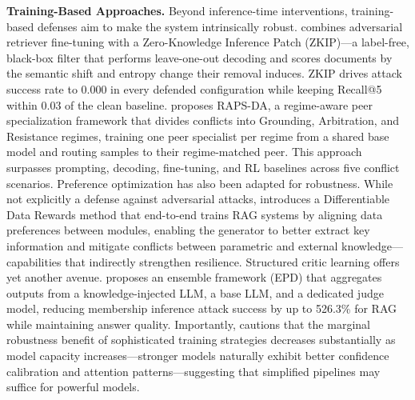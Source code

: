 \documentclass[11pt]{article}
\begin{document}
\textbf{Training-Based Approaches.} Beyond inference-time interventions, training-based defenses aim to make the system intrinsically robust. \cite{ref450} combines adversarial retriever fine-tuning with a Zero-Knowledge Inference Patch (ZKIP)---a label-free, black-box filter that performs leave-one-out decoding and scores documents by the semantic shift and entropy change their removal induces. ZKIP drives attack success rate to 0.000 in every defended configuration while keeping Recall@5 within 0.03 of the clean baseline. \cite{ref451} proposes RAPS-DA, a regime-aware peer specialization framework that divides conflicts into Grounding, Arbitration, and Resistance regimes, training one peer specialist per regime from a shared base model and routing samples to their regime-matched peer. This approach surpasses prompting, decoding, fine-tuning, and RL baselines across five conflict scenarios. Preference optimization has also been adapted for robustness. While not explicitly a defense against adversarial attacks, \cite{ref20} introduces a Differentiable Data Rewards method that end-to-end trains RAG systems by aligning data preferences between modules, enabling the generator to better extract key information and mitigate conflicts between parametric and external knowledge---capabilities that indirectly strengthen resilience. Structured critic learning offers yet another avenue. \cite{ref452} proposes an ensemble framework (EPD) that aggregates outputs from a knowledge-injected LLM, a base LLM, and a dedicated judge model, reducing membership inference attack success by up to 526.3\% for RAG while maintaining answer quality. Importantly, \cite{ref453} cautions that the marginal robustness benefit of sophisticated training strategies decreases substantially as model capacity increases---stronger models naturally exhibit better confidence calibration and attention patterns---suggesting that simplified pipelines may suffice for powerful models.
\end{document}
